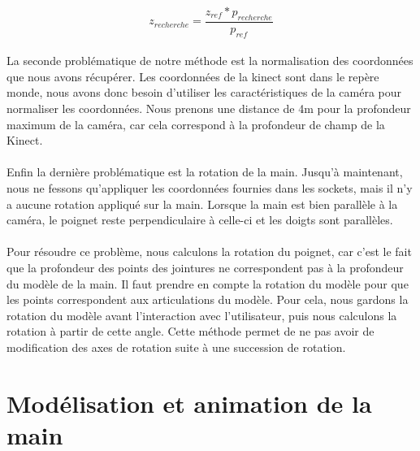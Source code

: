\begin{equation}
 z_{recherche} = \frac{z_{ref} * p_{recherche}}{p_{ref}}
\end{equation}

\paragraph{}
La seconde problématique de notre méthode est la normalisation des coordonnées que nous avons récupérer. Les coordonnées
de la kinect sont dans le repère monde, nous avons donc besoin d'utiliser les caractéristiques de la caméra pour normaliser
les coordonnées. Nous prenons une distance de 4m pour la profondeur maximum de la caméra, car cela correspond à la profondeur 
de champ de la Kinect.

\paragraph{}
Enfin la dernière problématique est la rotation de la main. Jusqu'à maintenant, nous ne fessons qu'appliquer les coordonnées
fournies dans les sockets, mais il n'y a aucune rotation appliqué sur la main. Lorsque la main est bien parallèle à la caméra,
le poignet reste perpendiculaire à celle-ci et les doigts sont parallèles.

\paragraph{}
Pour résoudre ce problème, nous calculons la rotation du poignet, car c'est le fait que la profondeur des points des jointures
ne correspondent pas à la profondeur du modèle de la main. Il faut prendre en compte la rotation du modèle pour que les points
correspondent aux articulations du modèle. Pour cela, nous gardons la rotation du modèle avant l'interaction avec l'utilisateur,
puis nous calculons la rotation à partir de cette angle. Cette méthode permet de ne pas avoir de modification des axes de rotation
suite à une succession de rotation.



\section{Modélisation et animation de la main}
